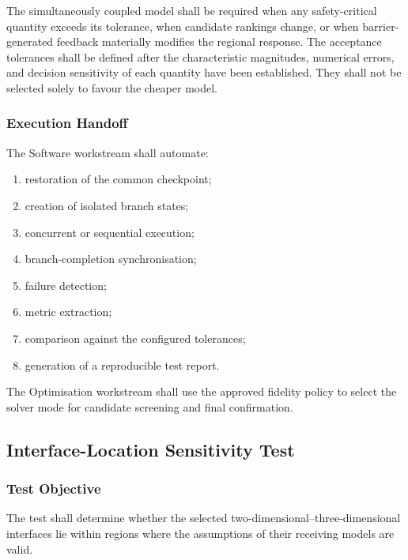 The simultaneously coupled model shall be required when any
safety-critical quantity exceeds its tolerance, when candidate rankings
change, or when barrier-generated feedback materially modifies the
regional response. The acceptance tolerances shall be defined after the
characteristic magnitudes, numerical errors, and decision sensitivity of
each quantity have been established. They shall not be selected solely
to favour the cheaper model.

\subsubsection{Execution Handoff}
\label{sec:res-ver-tst-coupling-mode-handoff}

The Software workstream shall automate:

\begin{enumerate}
  \item restoration of the common checkpoint;
  \item creation of isolated branch states;
  \item concurrent or sequential execution;
  \item branch-completion synchronisation;
  \item failure detection;
  \item metric extraction;
  \item comparison against the configured tolerances;
  \item generation of a reproducible test report.
\end{enumerate}

The Optimisation workstream shall use the approved fidelity policy to
select the solver mode for candidate screening and final confirmation.

\subsection{Interface-Location Sensitivity Test}
\label{sec:res-ver-tst-interface-location}

\subsubsection{Test Objective}
\label{sec:res-ver-tst-interface-location-objective}

The test shall determine whether the selected
two-dimensional--three-dimensional interfaces lie within regions where
the assumptions of their receiving models are valid.

